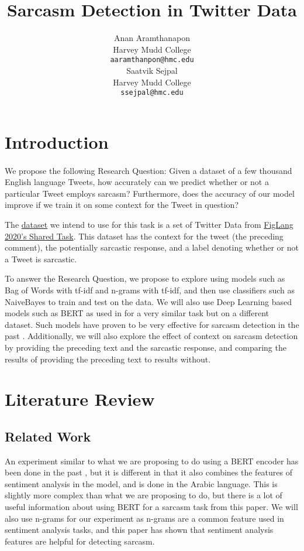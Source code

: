 \documentclass[11pt,a4paper]{article}
\title{Sarcasm Detection in Twitter Data}
\author{Anan Aramthanapon \\
  Harvey Mudd College \\
  \texttt{aaramthanpon@hmc.edu} \\\And
  Saatvik Sejpal \\
  Harvey Mudd College \\
  \texttt{ssejpal@hmc.edu} \\}
\date{}
\begin{document}
\maketitle

\section{Introduction}

\paragraph{} We propose the following Research Question: Given a dataset of a few thousand English language Tweets, how accurately can we predict whether or not a particular Tweet employs sarcasm?
Furthermore, does the accuracy of our model improve if we train it on some context for the Tweet in question?

The \href{https://github.com/EducationalTestingService/sarcasm/releases}{dataset} we intend to use for this task is a set of Twitter Data from \href{https://sites.google.com/view/figlang2020/}{FigLang 2020's Shared Task}. This dataset has the context for the tweet (the preceding comment), the potentially sarcastic response, and a label denoting whether or not a Tweet is sarcastic.

To answer the Research Question, we propose to explore using models such as Bag of Words with tf-idf and n-grams with tf-idf, and then use classifiers such as NaiveBayes to train and test on the data. 
We will also use Deep Learning based models such as BERT \cite{devlin2019bert} as used in \cite{Ghosh-Muresan} for a very similar task but on a different dataset. Such models have proven to be very effective for sarcasm detection in the past \cite{Ghosh-Muresan}.
Additionally, we will also explore the effect of context on sarcasm detection by providing the preceding text and the sarcastic response, and comparing the results of providing the preceding text to results without.


\section{Literature Review}
\subsection{Related Work}

An experiment similar to what we are proposing to do using a BERT encoder has been done in the past \cite{abu-farha}, but it is different in that it also combines the features of sentiment analysis in the model, and is done in the Arabic language. This is slightly more complex than what we are proposing to do, but there is a lot of useful information about using BERT for a sarcasm task from this paper. We will also use n-grams for our experiment as n-grams are a common feature used in sentiment analysis tasks, and this paper has shown that sentiment analysis features are helpful for detecting sarcasm.
\end{document}
